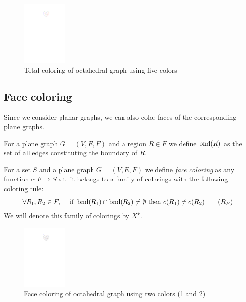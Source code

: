\begin{figure}[H]
    \centering
    \includegraphics[width=0.2\textwidth]{../Resources/Figs/octahedral_tot_colr.pdf}
    \caption{Total coloring of octahedral graph using five colors}
    \label{fig:octahedral_tot_coloring}
\end{figure}

\subsection{Face coloring}

Since we consider planar graphs, we can also color faces of the corresponding plane graphs.

\begin{definition}
    For a plane graph $G=(V,E,F)$ and a region $R \in F$ we define $\operatorname{bnd}(R)$ as the set of all edges constituting the boundary of $R$.
\end{definition}

\begin{definition}
    For a set $S$ and a plane graph $G=(V,E,F)$ we define \textit{face coloring} as any function $c: F \rightarrow S$ s.t. it belongs to a family of colorings with the following coloring rule:
    \begin{equation}\label{eqn:face_rule}
     \forall R_1,R_2 \in F, \quad \text{ if } \operatorname{bnd}(R_1) \cap \operatorname{bnd}(R_2) \neq \emptyset \text{ then } c(R_1) \neq c(R_2) \tag{$R_F$}
    \end{equation}
    We will denote this family of colorings by $X^F$.
\end{definition}

\begin{figure}[H]
    \centering
    \includegraphics[width=0.2\textwidth]{../Resources/Figs/octahedral_face_colr.pdf}
    \caption{Face coloring of octahedral graph using two colors (1 and 2)}
    \label{fig:face_tot_coloring}
\end{figure}

